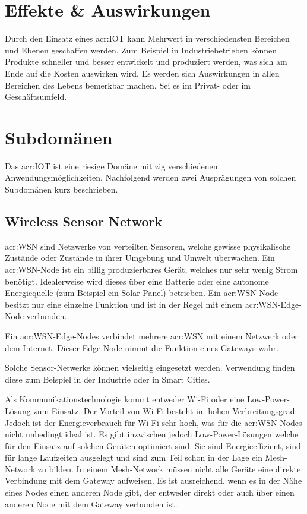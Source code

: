 \section{Effekte \& Auswirkungen}

Durch den Einsatz eines \gls{acr:IOT} kann Mehrwert in verschiedensten Bereichen und Ebenen geschaffen werden. Zum Beispiel in Industriebetrieben können Produkte schneller und besser entwickelt und produziert werden, was sich am Ende auf die Kosten auswirken wird. Es werden sich Auswirkungen in allen Bereichen des Lebens bemerkbar machen. Sei es im Privat- oder im Geschäftsumfeld.


\section{Subdomänen}
Das \gls{acr:IOT} ist eine riesige Domäne mit zig verschiedenen Anwendungsmöglichkeiten. Nachfolgend werden zwei Ausprägungen von solchen Subdomänen kurz beschrieben.


\subsection{Wireless Sensor Network}	
\gls{acr:WSN} sind Netzwerke von verteilten Sensoren, welche gewisse physikalische Zustände oder Zustände in ihrer Umgebung und Umwelt überwachen. Ein \gls{acr:WSN}-Node ist ein billig produzierbares Gerät, welches nur sehr wenig Strom benötigt. Idealerweise wird dieses über eine Batterie oder eine autonome Energiequelle (zum Beispiel ein Solar-Panel) betrieben. Ein \gls{acr:WSN}-Node besitzt nur eine einzelne Funktion und ist in der Regel mit einem \gls{acr:WSN}-Edge-Node verbunden.

Ein \gls{acr:WSN}-Edge-Nodes verbindet mehrere \gls{acr:WSN} mit einem Netzwerk oder dem Internet. Dieser Edge-Node nimmt die Funktion eines Gateways wahr.

Solche Sensor-Netwerke können vielseitig eingesetzt werden. Verwendung finden diese zum Beispiel in der Industrie oder in Smart Cities.

Als Kommunikationstechnologie kommt entweder Wi-Fi oder eine Low-Power-Lösung zum Einsatz. Der Vorteil von Wi-Fi besteht im hohen Verbreitungsgrad. Jedoch ist der Energieverbrauch für Wi-Fi sehr hoch, was für die \gls{acr:WSN}-Nodes nicht unbedingt ideal ist. Es gibt inzwischen jedoch Low-Power-Lösungen welche für den Einsatz auf solchen Geräten optimiert sind. Sie sind Energieeffizient, sind für lange Laufzeiten ausgelegt und sind zum Teil schon in der Lage ein Mesh-Network zu bilden. In einem Mesh-Network müssen nicht alle Geräte eine direkte Verbindung mit dem Gateway aufweisen. Es ist ausreichend, wenn es in der Nähe eines Nodes einen anderen Node gibt, der entweder direkt oder auch über einen anderen Node mit dem Gateway verbunden ist.

